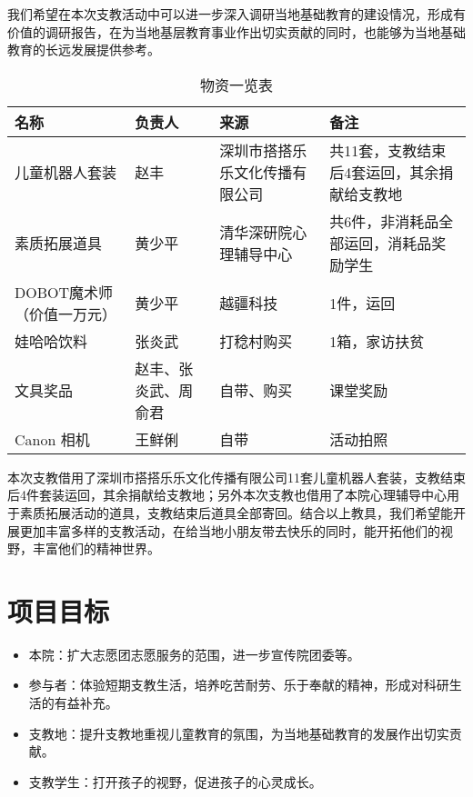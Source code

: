 \documentclass[12pt]{ctexart}
\begin{document}
我们希望在本次支教活动中可以进一步深入调研当地基础教育的建设情况，形成有价值的调研报告，在为当地基层教育事业作出切实贡献的同时，也能够为当地基础教育的长远发展提供参考。
\begin{table}[!ht]
\centering
\begin{tabular}{|p{2cm}|p{2cm}|p{2cm}|p{3cm}|}
\hline
名称 & 负责人 & 来源 & 备注 \\
\hline
儿童机器人套装 & 赵丰 & 深圳市搭搭乐乐文化传播有限公司 & 共11套，支教结束后4套运回，其余捐献给支教地 \\
\hline
素质拓展道具 & 黄少平 & 清华深研院心理辅导中心 & 共6件，非消耗品全部运回，消耗品奖励学生 \\
\hline
DOBOT魔术师（价值一万元） & 黄少平 & 越疆科技 & 1件，运回 \\
\hline
娃哈哈饮料 & 张炎武 & 打稔村购买 & 1箱，家访扶贫 \\
\hline
文具奖品 & 赵丰、张炎武、周俞君 & 自带、购买 & 课堂奖励 \\
\hline
Canon 相机 & 王鲜俐 & 自带 & 活动拍照 \\
\hline
\end{tabular}
\caption{物资一览表}
\end{table}
本次支教借用了深圳市搭搭乐乐文化传播有限公司11套儿童机器人套装，支教结束后4件套装运回，其余捐献给支教地；另外本次支教也借用了本院心理辅导中心用于素质拓展活动的道具，支教结束后道具全部寄回。结合以上教具，我们希望能开展更加丰富多样的支教活动，在给当地小朋友带去快乐的同时，能开拓他们的视野，丰富他们的精神世界。
\section{项目目标}
\begin{itemize}
\item 本院：扩大志愿团志愿服务的范围，进一步宣传院团委等。
\item 参与者：体验短期支教生活，培养吃苦耐劳、乐于奉献的精神，形成对科研生活的有益补充。
\item 支教地：提升支教地重视儿童教育的氛围，为当地基础教育的发展作出切实贡献。
\item 支教学生：打开孩子的视野，促进孩子的心灵成长。
\end{itemize}
\end{document}
